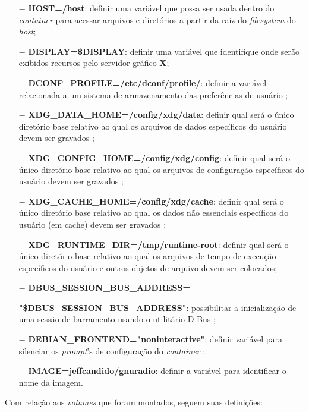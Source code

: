 \documentclass[
  12pt,				%
  openright,			%
  twoside,			%
  a4paper,			%
  english,			%
  french,				%
  spanish,			%
  brazil,				%
  ]{abntex2}
\begin{document}
\begin{itemize}
  \item[$-$] \textbf{HOST=/host}: definir uma variável que possa ser usada dentro do \textit{container} para acessar
        arquivos e diretórios a partir da raiz do \textit{filesystem} do \textit{host};
  \item[$-$] \textbf{DISPLAY=\$DISPLAY}: definir uma variável que identifique onde serão exibidos recursos pelo servidor gráfico \textbf{X};
  \item[$-$] \textbf{DCONF\_PROFILE=/etc/dconf/profile/}: definir a variável relacionada a um sistema de armazenamento das
        preferências de usuário \cite{GNOME-dconf-overview:2020};
  \item[$-$] \textbf{XDG\_DATA\_HOME=/config/xdg/data}: definir qual será o único diretório base relativo ao qual os arquivos
        de dados específicos do usuário devem ser gravados \cite{freedesktop-XDG:2020};
  \item[$-$] \textbf{XDG\_CONFIG\_HOME=/config/xdg/config}: definir qual será o único diretório base relativo ao qual os arquivos
        de configuração específicos do usuário devem ser gravados \cite{freedesktop-XDG:2020};
  \item[$-$] \textbf{XDG\_CACHE\_HOME=/config/xdg/cache}: definir qual será o único diretório base relativo ao qual os dados não
        essenciais específicos do usuário (em cache) devem ser gravados \cite{freedesktop-XDG:2020};
  \item[$-$] \textbf{XDG\_RUNTIME\_DIR=/tmp/runtime-root}: definir qual será o único diretório base relativo ao qual os arquivos de
        tempo de execução específicos do usuário e outros objetos de arquivo devem ser colocados;
  \item[$-$] \textbf{DBUS\_SESSION\_BUS\_ADDRESS=}

        \textbf{"\$DBUS\_SESSION\_BUS\_ADDRESS"}: possibilitar a inicialização de uma sessão de barramento usando o utilitário D-Bus \cite{freedesktop-DBUS:2020};
  \item[$-$] \textbf{DEBIAN\_FRONTEND="noninteractive"}: definir variável para silenciar os \textit{prompt}'s de configuração do \textit{container} \cite{Debian:non-interactive};
  \item[$-$] \textbf{IMAGE=jeffcandido/gnuradio}: definir a variável para identificar o nome da imagem.
\end{itemize}

Com relação aos \textit{volumes} que foram montados, seguem suas definições:
\end{document}
